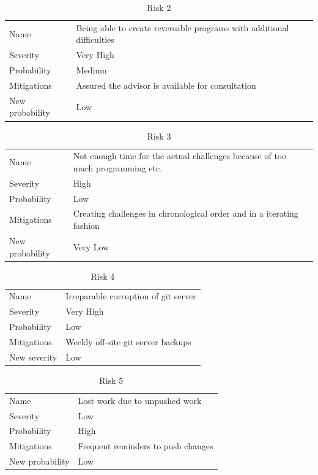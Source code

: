 \begin{table}
  \centering
  \begin{tabular}{ll}
    Name            & Being able to create reversable programs with additional difficulties           \\
    Severity        & Very High                                 \\
    Probability     & Medium                                   \\
    Mitigations     & Assured the advisor is available for consultation  \\
    New probability & Low                                   
  \end{tabular}
  \caption{Risk 2}
\end{table}

\begin{table}
  \centering
  \begin{tabular}{ll}
    Name            & Not enough time for the actual challenges because of too much programming etc.           \\
    Severity        & High                                 \\
    Probability     & Low                                   \\
    Mitigations     & Creating challenges in chronological order and in a iterating fashion  \\
    New probability & Very Low                                   
  \end{tabular}
  \caption{Risk 3}
\end{table}

\begin{table}
  \centering
  \begin{tabular}{ll}
    Name            & Irreparable corruption of git server           \\
    Severity        & Very High                                 \\
    Probability     & Low                                   \\
    Mitigations     & Weekly off-site git server backups  \\
    New severity    & Low                                   
  \end{tabular}
  \caption{Risk 4}
\end{table}

\begin{table}
  \centering
  \begin{tabular}{ll}
    Name            & Lost work due to unpushed work           \\
    Severity        & Low                                 \\
    Probability     & High                                   \\
    Mitigations     & Frequent reminders to push changes  \\
    New probability & Low                                   
  \end{tabular}
  \caption{Risk 5}
\end{table}

